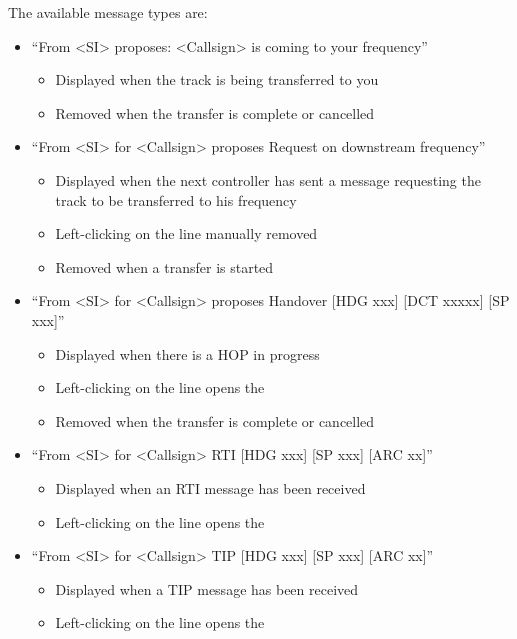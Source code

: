 \documentclass[11pt,a4paper]{memoir}
\begin{document}
The available message types are:

\begin{itemize} 
    \item “From <SI> proposes: <Callsign> is coming to your frequency”
         \begin{itemize} 
            \item Displayed when the track is being transferred to you
            \item Removed when the transfer is complete or cancelled
         \end{itemize}
    \item “From <SI> for <Callsign> proposes Request on downstream frequency”
         \begin{itemize}
            \item Displayed when the next controller has sent a message requesting the track to be transferred to his frequency
            \item Left-clicking on the line manually removed
            \item Removed when a transfer is started
         \end{itemize} 
    \item “From <SI> for <Callsign> proposes Handover [HDG xxx] [DCT xxxxx] [SP xxx]”
        \begin{itemize}
            \item Displayed when there is a HOP in progress
            \item Left-clicking on the line opens the \textit{}
            \item Removed when the transfer is complete or cancelled
        \end{itemize} 
    \item “From <SI> for <Callsign> RTI [HDG xxx] [SP xxx] [ARC xx]”
        \begin{itemize}
            \item Displayed when an RTI message has been received
            \item Left-clicking on the line opens the \textit{}
        \end{itemize} 
    \item “From <SI> for <Callsign> TIP [HDG xxx] [SP xxx] [ARC xx]”
        \begin{itemize}
            \item Displayed when a TIP message has been received
            \item Left-clicking on the line opens the \textit{}

\end{itemize}
\end{itemize}
\end{document}

